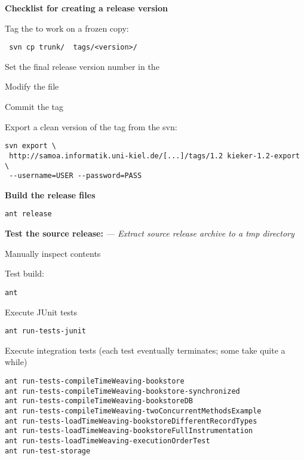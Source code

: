 \textbf{Checklist for creating a release version}

\begin{compactenum}
\item Tag the  to work on a frozen copy:
\setBashListing
\begin{lstlisting}
 svn cp trunk/  tags/<version>/
\end{lstlisting}
\item Set the final release version number in the 
\item Modify the  file
\item Commit the tag
\item Export a clean version of the tag from the svn:
\setBashListing
\begin{lstlisting}
svn export \
 http://samoa.informatik.uni-kiel.de/[...]/tags/1.2 kieker-1.2-export \
 --username=USER --password=PASS
\end{lstlisting}
\item \textbf{Build the release files}
\setBashListing
\begin{lstlisting}
ant release
\end{lstlisting}
\item \textbf{Test the source release:} \textit{--- Extract source release archive to a tmp directory}
\begin{compactenum}
\item Manually inspect contents
\item Test build:
\setBashListing
\begin{lstlisting}
ant
\end{lstlisting}
\item Execute JUnit tests
\setBashListing
\begin{lstlisting}
ant run-tests-junit
\end{lstlisting}
\item Execute integration tests (each test eventually terminates; some take quite a while)
\setBashListing
\begin{lstlisting}
ant run-tests-compileTimeWeaving-bookstore
ant run-tests-compileTimeWeaving-bookstore-synchronized
ant run-tests-compileTimeWeaving-bookstoreDB
ant run-tests-compileTimeWeaving-twoConcurrentMethodsExample
ant run-tests-loadTimeWeaving-bookstoreDifferentRecordTypes
ant run-tests-loadTimeWeaving-bookstoreFullInstrumentation
ant run-tests-loadTimeWeaving-executionOrderTest
ant run-test-storage
\end{lstlisting}
\end{compactenum}


\end{compactenum}
